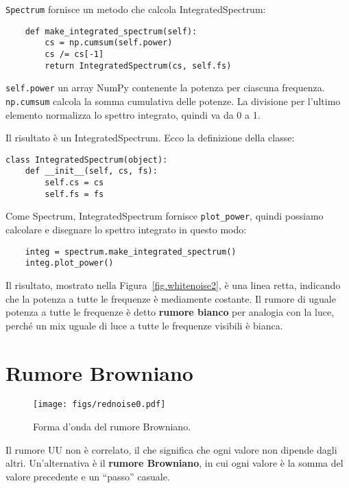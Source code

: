 \documentclass[12pt,a4paper]{book}
\begin{document}
{\tt Spectrum} fornisce un metodo che calcola IntegratedSpectrum:

\begin{verbatim} 
    def make_integrated_spectrum(self):
        cs = np.cumsum(self.power)
        cs /= cs[-1]
        return IntegratedSpectrum(cs, self.fs)
 \end{verbatim} 

{\tt self.power} un array NumPy contenente la potenza per ciascuna frequenza. {\tt np.cumsum} calcola la somma cumulativa delle potenze. La divisione per l'ultimo elemento normalizza lo spettro integrato, quindi va da 0 a 1.

Il risultato è un IntegratedSpectrum. Ecco la definizione della classe:

\begin{verbatim} 
class IntegratedSpectrum(object):
    def __init__(self, cs, fs):
        self.cs = cs
        self.fs = fs
 \end{verbatim} 

Come Spectrum, IntegratedSpectrum fornisce \verb"plot_power", quindi possiamo calcolare e disegnare lo spettro integrato in questo modo:

\begin{verbatim} 
    integ = spectrum.make_integrated_spectrum()
    integ.plot_power()
 \end{verbatim} 

Il risultato, mostrato nella Figura~\ref{fig.whitenoise2}, è una linea retta, indicando che la potenza a tutte le frequenze è mediamente costante. Il rumore di uguale potenza a tutte le frequenze è detto {\bf rumore bianco} per analogia con la luce, perché un mix uguale di luce a tutte le frequenze visibili è bianca.

\section{Rumore Browniano} \label{brownian} 

\begin{figure} 

\centerline{\texttt{[image: figs/rednoise0.pdf]}} \caption{Forma d'onda del rumore Browniano.} \label{fig.rednoise0} \end{figure} 

Il rumore UU non è correlato, il che significa che ogni valore non dipende dagli altri. Un'alternativa è il {\bf rumore Browniano}, in cui ogni valore è la somma del valore precedente e un ``passo'' casuale.
\end{document}
